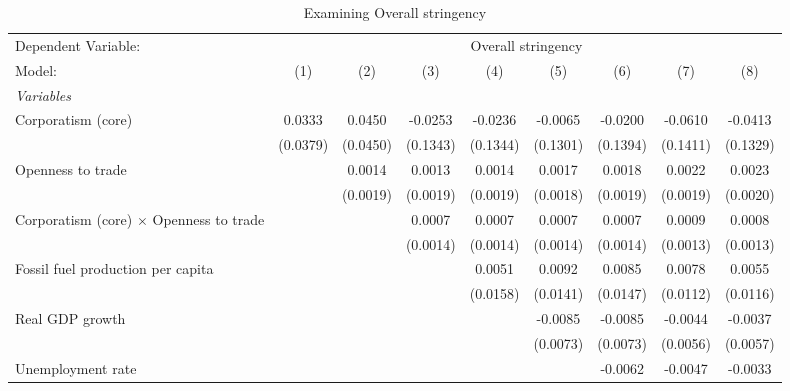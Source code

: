 
\begin{table}[htbp]
   \caption{Examining Overall stringency}
   \centering
   \begin{tabular}{lcccccccc}
      \tabularnewline \midrule \midrule
      Dependent Variable: & \multicolumn{8}{c}{Overall stringency}\\
      Model:                                         & (1)      & (2)      & (3)      & (4)      & (5)      & (6)      & (7)      & (8)\\  
      \midrule
      \emph{Variables}\\
      Corporatism (core)                             & 0.0333   & 0.0450   & -0.0253  & -0.0236  & -0.0065  & -0.0200  & -0.0610  & -0.0413\\   
                                                     & (0.0379) & (0.0450) & (0.1343) & (0.1344) & (0.1301) & (0.1394) & (0.1411) & (0.1329)\\   
      Openness to trade                              &          & 0.0014   & 0.0013   & 0.0014   & 0.0017   & 0.0018   & 0.0022   & 0.0023\\   
                                                     &          & (0.0019) & (0.0019) & (0.0019) & (0.0018) & (0.0019) & (0.0019) & (0.0020)\\   
      Corporatism (core) $\times$ Openness to trade  &          &          & 0.0007   & 0.0007   & 0.0007   & 0.0007   & 0.0009   & 0.0008\\   
                                                     &          &          & (0.0014) & (0.0014) & (0.0014) & (0.0014) & (0.0013) & (0.0013)\\   
      Fossil fuel production per capita              &          &          &          & 0.0051   & 0.0092   & 0.0085   & 0.0078   & 0.0055\\   
                                                     &          &          &          & (0.0158) & (0.0141) & (0.0147) & (0.0112) & (0.0116)\\   
      Real GDP growth                                &          &          &          &          & -0.0085  & -0.0085  & -0.0044  & -0.0037\\   
                                                     &          &          &          &          & (0.0073) & (0.0073) & (0.0056) & (0.0057)\\   
      Unemployment rate                              &          &          &          &          &          & -0.0062  & -0.0047  & -0.0033\\   

\end{tabular}
\end{table}
